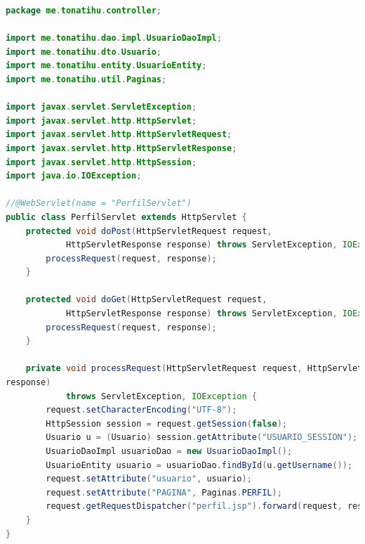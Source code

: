\documentclass[a4paper,12pt]{article}
\begin{document}
\begin{lstlisting}[language=Java, style=customJava, 
caption={PerfilServlet.java}, captionpos=b,basicstyle=\fontfamily{cmss}\small]
package me.tonatihu.controller;

import me.tonatihu.dao.impl.UsuarioDaoImpl;
import me.tonatihu.dto.Usuario;
import me.tonatihu.entity.UsuarioEntity;
import me.tonatihu.util.Paginas;

import javax.servlet.ServletException;
import javax.servlet.http.HttpServlet;
import javax.servlet.http.HttpServletRequest;
import javax.servlet.http.HttpServletResponse;
import javax.servlet.http.HttpSession;
import java.io.IOException;

//@WebServlet(name = "PerfilServlet")
public class PerfilServlet extends HttpServlet {
    protected void doPost(HttpServletRequest request,
            HttpServletResponse response) throws ServletException, IOException {
        processRequest(request, response);
    }

    protected void doGet(HttpServletRequest request,
            HttpServletResponse response) throws ServletException, IOException {
        processRequest(request, response);
    }

    private void processRequest(HttpServletRequest request, HttpServletResponse 
response)
            throws ServletException, IOException {
        request.setCharacterEncoding("UTF-8");
        HttpSession session = request.getSession(false);
        Usuario u = (Usuario) session.getAttribute("USUARIO_SESSION");
        UsuarioDaoImpl usuarioDao = new UsuarioDaoImpl();
        UsuarioEntity usuario = usuarioDao.findById(u.getUsername());
        request.setAttribute("usuario", usuario);
        request.setAttribute("PAGINA", Paginas.PERFIL);
        request.getRequestDispatcher("perfil.jsp").forward(request, response);
    }
}
\end{lstlisting}
\end{document}
